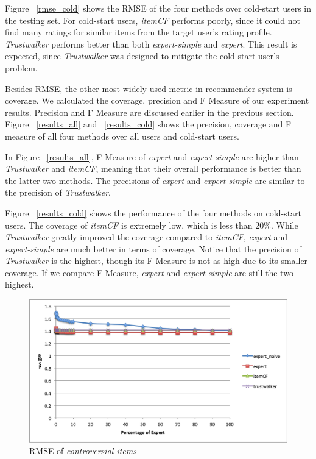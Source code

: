 \documentclass[12pt]{article}
\begin{document}
Figure ~\ref{rmse_cold} shows the RMSE of the four methods over cold-start users in the testing set. For cold-start users, \emph{itemCF} performs poorly, since it could not find many ratings for similar items from the target user's rating profile. \emph{Trustwalker} performs better than both \emph{expert-simple} and \emph{expert}. This result is expected, since \emph{Trustwalker} was designed to mitigate the cold-start user's problem. 



Besides RMSE, the other most widely used metric in recommender system is coverage. We calculated the coverage, precision and F Measure of our experiment results. Precision and F Measure are discussed earlier in the previous section. Figure ~\ref{results_all} and ~\ref{results_cold} shows the precision, coverage and F measure of all four methods over all users and cold-start users. 

In Figure ~\ref{results_all}, F Measure of \emph{expert} and \emph{expert-simple} are higher than \emph{Trustwalker} and \emph{itemCF}, meaning that their overall performance is better than the latter two methods. The precisions of \emph{expert} and \emph{expert-simple} are similar to the precision of \emph{Trustwalker}. 

Figure ~\ref{results_cold} shows the performance of the four methods on cold-start users. The coverage of \emph{itemCF} is extremely low, which is less than 20\%. While \emph{Trustwalker} greatly improved the coverage compared to \emph{itemCF}, \emph{expert} and \emph{expert-simple} are much better in terms of coverage. Notice that the precision of \emph{Trustwalker} is the highest, though its F Measure is not as high due to its smaller coverage. If we compare F Measure, \emph{expert} and \emph{expert-simple} are still the two highest.

\begin{figure}[htbp]
\centering
	\includegraphics[width=12cm]{graphics/con_all_user.png}	
	\caption{RMSE of \emph{controversial items}}
	\label{con_all_user}
\end{figure}
\end{document}
